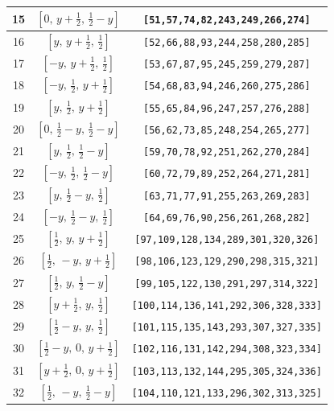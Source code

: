 \documentclass[fleqn,8pt]{jsarticle}
\begin{document}
\begin{longtable}{ccc}
15 & $\left[ 0,\, y + \frac{1}{2},\, \frac{1}{2} - y \right]$ & {\tt [51,57,74,82,243,249,266,274]} \\ \hline
16 & $\left[ y,\, y + \frac{1}{2},\, \frac{1}{2} \right]$ & {\tt [52,66,88,93,244,258,280,285]} \\ \hline
17 & $\left[ - y,\, y + \frac{1}{2},\, \frac{1}{2} \right]$ & {\tt [53,67,87,95,245,259,279,287]} \\ \hline
18 & $\left[ - y,\, \frac{1}{2},\, y + \frac{1}{2} \right]$ & {\tt [54,68,83,94,246,260,275,286]} \\ \hline
19 & $\left[ y,\, \frac{1}{2},\, y + \frac{1}{2} \right]$ & {\tt [55,65,84,96,247,257,276,288]} \\ \hline
20 & $\left[ 0,\, \frac{1}{2} - y,\, \frac{1}{2} - y \right]$ & {\tt [56,62,73,85,248,254,265,277]} \\ \hline
21 & $\left[ y,\, \frac{1}{2},\, \frac{1}{2} - y \right]$ & {\tt [59,70,78,92,251,262,270,284]} \\ \hline
22 & $\left[ - y,\, \frac{1}{2},\, \frac{1}{2} - y \right]$ & {\tt [60,72,79,89,252,264,271,281]} \\ \hline
23 & $\left[ y,\, \frac{1}{2} - y,\, \frac{1}{2} \right]$ & {\tt [63,71,77,91,255,263,269,283]} \\ \hline
24 & $\left[ - y,\, \frac{1}{2} - y,\, \frac{1}{2} \right]$ & {\tt [64,69,76,90,256,261,268,282]} \\ \hline
25 & $\left[ \frac{1}{2},\, y,\, y + \frac{1}{2} \right]$ & {\tt [97,109,128,134,289,301,320,326]} \\ \hline
26 & $\left[ \frac{1}{2},\, - y,\, y + \frac{1}{2} \right]$ & {\tt [98,106,123,129,290,298,315,321]} \\ \hline
27 & $\left[ \frac{1}{2},\, y,\, \frac{1}{2} - y \right]$ & {\tt [99,105,122,130,291,297,314,322]} \\ \hline
28 & $\left[ y + \frac{1}{2},\, y,\, \frac{1}{2} \right]$ & {\tt [100,114,136,141,292,306,328,333]} \\ \hline
29 & $\left[ \frac{1}{2} - y,\, y,\, \frac{1}{2} \right]$ & {\tt [101,115,135,143,293,307,327,335]} \\ \hline
30 & $\left[ \frac{1}{2} - y,\, 0,\, y + \frac{1}{2} \right]$ & {\tt [102,116,131,142,294,308,323,334]} \\ \hline
31 & $\left[ y + \frac{1}{2},\, 0,\, y + \frac{1}{2} \right]$ & {\tt [103,113,132,144,295,305,324,336]} \\ \hline
32 & $\left[ \frac{1}{2},\, - y,\, \frac{1}{2} - y \right]$ & {\tt [104,110,121,133,296,302,313,325]} \\ \hline

\end{longtable}
\end{document}
